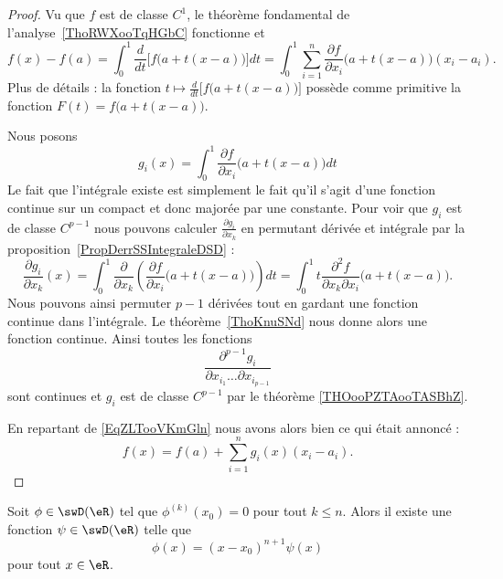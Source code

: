 \begin{proof}
    Vu que \( f\) est de classe \( C^1\), le théorème fondamental de l'analyse~\ref{ThoRWXooTqHGbC} fonctionne et
    \begin{equation}    \label{EqZLTooVKmGln}
        f(x)-f(a)=\int_0^1\frac{ d }{ dt }\Big[ f\big( a+t(x-a) \big) \Big]dt=\int_0^1\sum_{i=1}^n\frac{ \partial f }{ \partial x_i }\big( a+t(x-a) \big)(x_i-a_i).
    \end{equation}
    Plus de détails : la fonction \( t\mapsto \frac{ d }{ dt }\Big[ f\big( a+t(x-a) \big) \Big]\) possède comme primitive la fonction \( F(t)=f\big( a+t(x-a) \big)\).

    Nous posons
    \begin{equation}
        g_i(x)=\int_0^1\frac{ \partial f }{ \partial x_i }\big( a+t(x-a) \big)dt
    \end{equation}
    Le fait que l'intégrale existe est simplement le fait qu'il s'agit d'une fonction continue sur un compact et donc majorée par une constante. Pour voir que \( g_i\) est de classe \( C^{p-1}\) nous pouvons calculer \( \frac{ \partial g_i }{ \partial x_k }\) en permutant dérivée et intégrale par la proposition~\ref{PropDerrSSIntegraleDSD} :
    \begin{equation}
        \frac{ \partial g_i }{ \partial x_k }(x)=\int_0^1\frac{ \partial  }{ \partial x_k }\left( \frac{ \partial f }{ \partial x_i }\big( a+t(x-a) \big) \right)dt=\int_0^1 t\frac{ \partial^2f }{ \partial x_k\partial x_i }\big( a+t(x-a) \big).
    \end{equation}
    Nous pouvons ainsi permuter \( p-1\) dérivées tout en gardant une fonction continue dans l'intégrale. Le théorème~\ref{ThoKnuSNd} nous donne alors une fonction continue. Ainsi toutes les fonctions
    \begin{equation}
        \frac{ \partial^{p-1}g_i }{ \partial x_{i_1}\ldots\partial x_{i_{p-1}} }
    \end{equation}
    sont continues et \( g_i\) est de classe \( C^{p-1}\) par le théorème \ref{THOooPZTAooTASBhZ}.

    En repartant de \eqref{EqZLTooVKmGln} nous avons alors bien ce qui était annoncé :
    \begin{equation}
        f(x)=f(a)+\sum_{i=1}^ng_i(x)(x_i-a_i).
    \end{equation}
\end{proof}

\begin{corollary}       \label{CorQBXHooZVKeNG}
    Soit \( \phi\in\swD(\eR)\) tel que \( \phi^{(k)}(x_0)=0\) pour tout \( k\leq n\). Alors il existe une fonction \( \psi\in\swD(\eR)\) telle que
    \begin{equation}
        \phi(x)=(x-x_0)^{n+1}\psi(x)
    \end{equation}
    pour tout \( x\in \eR\).
\end{corollary}

